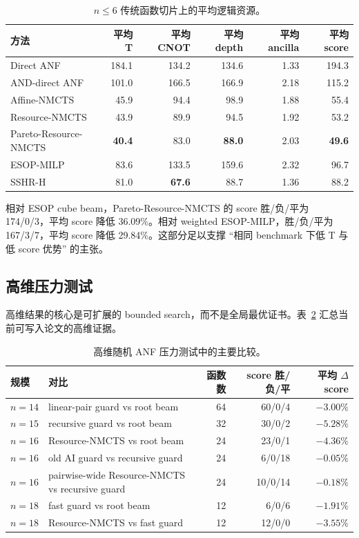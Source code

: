 \documentclass[UTF8,fontset=macnew,11pt]{ctexart}
\newcommand{\method}{Resource-NMCTS}
\newcommand{\pareto}{Pareto-Resource-NMCTS}
\begin{document}
\begin{table}[t]
\centering
\small
\caption{$n\leq6$ 传统函数切片上的平均逻辑资源。}
\label{tab:traditional}
\begin{tabular}{lrrrrr}
\toprule
方法 & 平均 T & 平均 CNOT & 平均 depth & 平均 ancilla & 平均 score \\
\midrule
Direct ANF & 184.1 & 134.2 & 134.6 & 1.33 & 194.3 \\
AND-direct ANF & 101.0 & 166.5 & 166.9 & 2.18 & 115.2 \\
Affine-NMCTS & 45.9 & 94.4 & 98.9 & 1.88 & 55.4 \\
\method{} & 43.9 & 89.9 & 94.5 & 1.92 & 53.2 \\
\pareto{} & \textbf{40.4} & 83.0 & \textbf{88.0} & 2.03 & \textbf{49.6} \\
ESOP-MILP & 83.6 & 133.5 & 159.6 & 2.32 & 96.7 \\
SSHR-H & 81.0 & \textbf{67.6} & 88.7 & 1.36 & 88.2 \\
\bottomrule
\end{tabular}
\end{table}

相对 ESOP cube beam，\pareto{} 的 score 胜/负/平为 174/0/3，平均 score 降低 36.09\%。相对 weighted ESOP-MILP，胜/负/平为 167/3/7，平均 score 降低 29.84\%。这部分足以支撑 ``相同 benchmark 下低 T 与低 score 优势'' 的主张。

\subsection{高维压力测试}

高维结果的核心是可扩展的 bounded search，而不是全局最优证书。表~\ref{tab:highdim} 汇总当前可写入论文的高维证据。

\begin{table}[t]
\centering
\small
\caption{高维随机 ANF 压力测试中的主要比较。}
\label{tab:highdim}
\begin{tabularx}{\linewidth}{llrrr}
\toprule
规模 & 对比 & 函数数 & score 胜/负/平 & 平均 $\Delta$ score \\
\midrule
$n=14$ & linear-pair guard vs root beam & 64 & 60/0/4 & $-3.00\%$ \\
$n=15$ & recursive guard vs root beam & 32 & 30/0/2 & $-5.28\%$ \\
$n=16$ & \method{} vs root beam & 24 & 23/0/1 & $-4.36\%$ \\
$n=16$ & old AI guard vs recursive guard & 24 & 6/0/18 & $-0.05\%$ \\
$n=16$ & pairwise-wide \method{} vs recursive guard & 24 & 10/0/14 & $-0.18\%$ \\
$n=18$ & fast guard vs root beam & 12 & 6/0/6 & $-1.91\%$ \\
$n=18$ & \method{} vs fast guard & 12 & 12/0/0 & $-3.55\%$ \\
\bottomrule
\end{tabularx}
\end{table}
\end{document}
